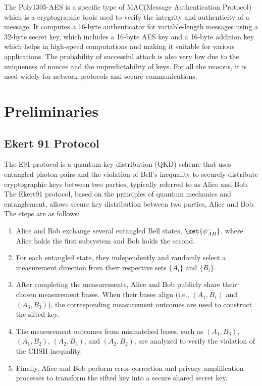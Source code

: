 \documentclass{article}
\begin{document}
The Poly1305-AES is a specific type of MAC(Message Authentication Protocol) which is a cryptographic tools used to verify the integrity and authenticity of a message.\cite{bernstein2005poly1305} It computes a 16-byte authenticator for variable-length messages using a 32-byte secret key, which includes a 16-byte AES key and a 16-byte addition key which helps in high-speed computations and making it suitable for various applications.\cite{bernstein2005poly1305} The probability of successful attack is also very low due to the uniqueness of nonces and the unpredictability of keys. For all the reasons, it is used widely for network protocols and secure communications.
\section{Preliminaries}
\label{sec:preliminaries}
\subsection{Ekert 91 Protocol}
\label{sec:e91}
The E91 protocol is a quantum key distribution (QKD) scheme that uses entangled photon pairs and the violation of Bell's inequality to securely distribute cryptographic keys between two parties, typically referred to as Alice and Bob.
The Ekert91 protocol, based on the principles of quantum mechanics and entanglement, allows secure key distribution between two parties, Alice and Bob. The steps are as follows:

\begin{enumerate}
    \item Alice and Bob exchange several entangled Bell states, $\ket{\psi^{-}_{AB}}$, where Alice holds the first subsystem and Bob holds the second.
    \item For each entangled state, they independently and randomly select a measurement direction from their respective sets $\{A_i\}$ and $\{B_i\}$.
    \item After completing the measurements, Alice and Bob publicly share their chosen measurement bases. When their bases align (i.e., $(A_1, B_1)$ and $(A_3, B_3)$), the corresponding measurement outcomes are used to construct the sifted key.
    \item The measurement outcomes from mismatched bases, such as $(A_1, B_3)$, $(A_1, B_2)$, $(A_2, B_3)$, and $(A_2, B_2)$, are analyzed to verify the violation of the CHSH inequality.
    \item Finally, Alice and Bob perform error correction and privacy amplification processes to transform the sifted key into a secure shared secret key.
\end{enumerate}
\end{document}
